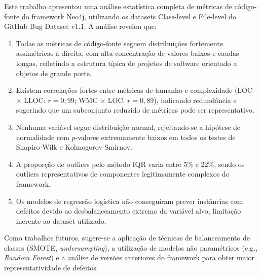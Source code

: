 \documentclass[12pt]{article}
\begin{document}
Este trabalho apresentou uma análise estatística completa de métricas de código-fonte do framework Neo4j, utilizando os datasets Class-level e File-level do GitHub Bug Dataset v1.1. A análise revelou que:

\begin{enumerate}
  \item Todas as métricas de código-fonte seguem distribuições fortemente assimétricas à direita, com alta concentração de valores baixos e caudas longas, refletindo a estrutura típica de projetos de software orientado a objetos de grande porte.
  \item Existem correlações fortes entre métricas de tamanho e complexidade (LOC $\times$ LLOC: $r = 0{,}99$; WMC $\times$ LOC: $r = 0{,}89$), indicando redundância e sugerindo que um subconjunto reduzido de métricas pode ser representativo.
  \item Nenhuma variável segue distribuição normal, rejeitando-se a hipótese de normalidade com $p$-valores extremamente baixos em todos os testes de Shapiro-Wilk e Kolmogorov-Smirnov.
  \item A proporção de outliers pelo método IQR varia entre 5\% e 22\%, sendo os outliers representativos de componentes legitimamente complexos do framework.
  \item Os modelos de regressão logística não conseguiram prever instâncias com defeitos devido ao desbalanceamento extremo da variável alvo, limitação inerente ao dataset utilizado.
\end{enumerate}

Como trabalhos futuros, sugere-se a aplicação de técnicas de balanceamento de classes (SMOTE, \textit{undersampling}), a utilização de modelos não paramétricos (e.g., \textit{Random Forest}) e a análise de versões anteriores do framework para obter maior representatividade de defeitos.



\end{document}
